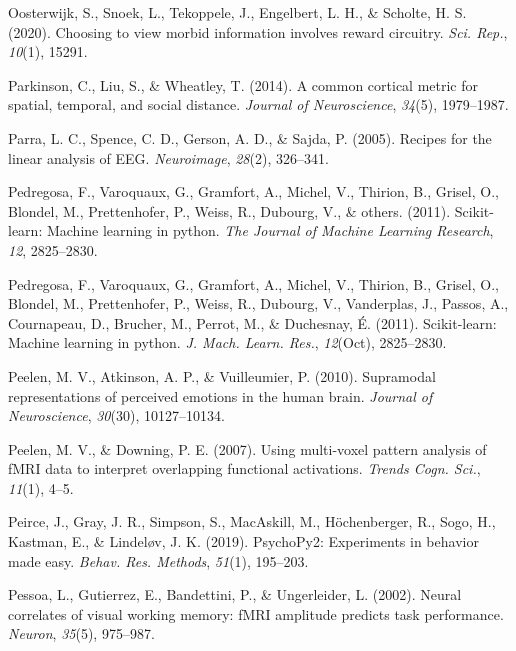 \documentclass[11pt,american,a4paper,oneside,]{memoir} %
\begin{document}
\leavevmode\hypertarget{ref-Oosterwijk2020-uf}{}%
Oosterwijk, S., Snoek, L., Tekoppele, J., Engelbert, L. H., \& Scholte, H. S. (2020). Choosing to view morbid information involves reward circuitry. \emph{Sci. Rep.}, \emph{10}(1), 15291.

\leavevmode\hypertarget{ref-parkinson2014common}{}%
Parkinson, C., Liu, S., \& Wheatley, T. (2014). A common cortical metric for spatial, temporal, and social distance. \emph{Journal of Neuroscience}, \emph{34}(5), 1979--1987.

\leavevmode\hypertarget{ref-Parra2005-um}{}%
Parra, L. C., Spence, C. D., Gerson, A. D., \& Sajda, P. (2005). Recipes for the linear analysis of EEG. \emph{Neuroimage}, \emph{28}(2), 326--341.

\leavevmode\hypertarget{ref-pedregosa2011scikit}{}%
Pedregosa, F., Varoquaux, G., Gramfort, A., Michel, V., Thirion, B., Grisel, O., Blondel, M., Prettenhofer, P., Weiss, R., Dubourg, V., \& others. (2011). Scikit-learn: Machine learning in python. \emph{The Journal of Machine Learning Research}, \emph{12}, 2825--2830.

\leavevmode\hypertarget{ref-Pedregosa2011-bp}{}%
Pedregosa, F., Varoquaux, G., Gramfort, A., Michel, V., Thirion, B., Grisel, O., Blondel, M., Prettenhofer, P., Weiss, R., Dubourg, V., Vanderplas, J., Passos, A., Cournapeau, D., Brucher, M., Perrot, M., \& Duchesnay, É. (2011). Scikit-learn: Machine learning in python. \emph{J. Mach. Learn. Res.}, \emph{12}(Oct), 2825--2830.

\leavevmode\hypertarget{ref-peelen2010supramodal}{}%
Peelen, M. V., Atkinson, A. P., \& Vuilleumier, P. (2010). Supramodal representations of perceived emotions in the human brain. \emph{Journal of Neuroscience}, \emph{30}(30), 10127--10134.

\leavevmode\hypertarget{ref-Peelen2007-ew}{}%
Peelen, M. V., \& Downing, P. E. (2007). Using multi-voxel pattern analysis of fMRI data to interpret overlapping functional activations. \emph{Trends Cogn. Sci.}, \emph{11}(1), 4--5.

\leavevmode\hypertarget{ref-Peirce2019-rj}{}%
Peirce, J., Gray, J. R., Simpson, S., MacAskill, M., Höchenberger, R., Sogo, H., Kastman, E., \& Lindeløv, J. K. (2019). PsychoPy2: Experiments in behavior made easy. \emph{Behav. Res. Methods}, \emph{51}(1), 195--203.

\leavevmode\hypertarget{ref-Pessoa2002-tb}{}%
Pessoa, L., Gutierrez, E., Bandettini, P., \& Ungerleider, L. (2002). Neural correlates of visual working memory: fMRI amplitude predicts task performance. \emph{Neuron}, \emph{35}(5), 975--987.
\end{document}

